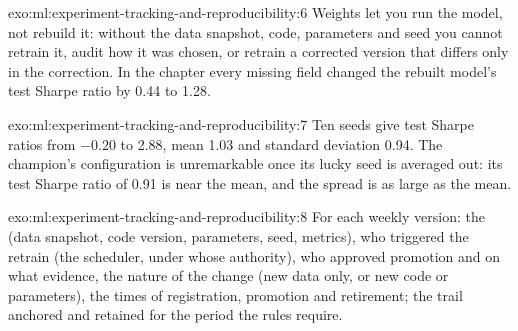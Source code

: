 \begin{solution}{exo:ml:experiment-tracking-and-reproducibility:6}
Weights let you run the model, not rebuild it: without the data snapshot, code, parameters and seed you cannot retrain it, audit
how it was chosen, or retrain a corrected version that differs only in the correction. In the chapter every missing field changed
the rebuilt model's test Sharpe ratio by 0.44 to 1.28.
\end{solution}

\begin{solution}{exo:ml:experiment-tracking-and-reproducibility:7}
Ten seeds give test Sharpe ratios from $-0.20$ to 2.88, mean 1.03 and standard deviation 0.94. The champion's configuration is
unremarkable once its lucky seed is averaged out: its test Sharpe ratio of 0.91 is near the mean, and the spread is as large as
the mean.
\end{solution}

\begin{solution}{exo:ml:experiment-tracking-and-reproducibility:8}
For each weekly version: the  (data snapshot, code version, parameters, seed, metrics), who triggered the retrain (the
scheduler, under whose authority), who approved promotion and on what evidence, the nature of the change (new data only, or new
code or parameters), the times of registration, promotion and retirement; the trail anchored and retained for the period the
rules require.
\end{solution}

